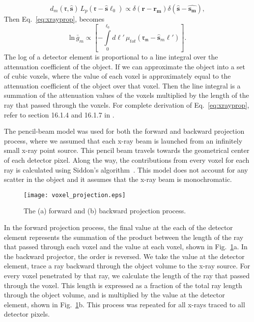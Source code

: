 %
\begin{equation}
d_m(\mathbf{\mathfrak{r}}, \hat{\mathbf{s}}) \, L_p(\mathbf{\mathfrak{r}} - \hat{\mathbf{s}} \ell_0) \propto 
\delta(\mathbf{r} - \mathbf{r_m}) \delta(\hat{\mathbf{s}} - \hat{\mathbf{s_m}}),
\end{equation}
%
Then Eq.~\ref{eq:xrayprop}, becomes 
\begin{equation}
\mathrm{ln} \, \bar{g}_m \propto \left[ -\int\limits_0^{\ell_0} d\ell' \, \mu_{tot}(\mathbf{\mathfrak{r_m}} - \mathbf{\hat{s}}_m \ell') \right].
\end{equation}
%
The log of a detector element is proportional to a line integral over the attenuation coefficient of the object.  If we can approximate the object into a set of cubic voxels, where the value of each voxel is approximately equal to the attenuation coefficient of the object over that voxel.  Then the line integral is a summation of the attenuation values of the voxels multiplied by the length of the ray that passed through the voxels.  For complete derivation of Eq.~\ref{eq:xrayprop}, refer to section 16.1.4 and 16.1.7 in \citep{Barrett2004}.

The pencil-beam model was used for both the forward and backward projection process, where we assumed that each x-ray beam is launched from an infinitely small x-ray point source. This pencil beam travels towards the geometrical center of each detector pixel.  Along the way, the contributions from every voxel for each ray is calculated using Siddon's algorithm~\citep{Siddon1985}.  This model does not account for any scatter in the object and it assumes that the x-ray beam is monochromatic.
%
\begin{figure}[h]
\centering
\texttt{[image: voxel\_projection.eps]}
\caption{The (a) forward and (b) backward projection process.}
\label{fig:voxel_projection}
\end{figure}

In the forward projection process, the final value at the each of the detector element represents the summation of the product between the length of the ray that passed through each voxel and the value at each voxel, shown in Fig.~\ref{fig:voxel_projection}a.  In the backward projector, the order is reversed. We take the value at the detector element, trace a ray backward through the object volume to the x-ray source.  For every voxel penetrated by that ray, we calculate the length of the ray that passed through the voxel.  This length is expressed as a fraction of the total ray length through the object volume, and is multiplied by the value at the detector element, shown in Fig.~\ref{fig:voxel_projection}b.  This process was repeated for all x-rays traced to all detector pixels.

